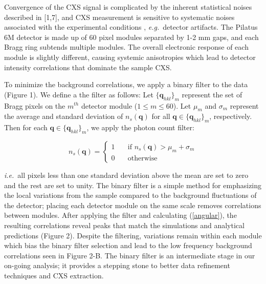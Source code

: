 \documentclass [11pt,fleqn]{article}
\begin{document}
Convergence of the CXS signal is complicated by the inherent statistical noises described in [1,7], and CXS measurement is sensitive to systematic noises associated with the experimental conditions \cite{Kam:1981ua}, \textit{e.g.}~detector artifacts. The Pilatus 6M detector is made up of 60 pixel modules separated by 1-2 mm gaps, and each Bragg ring subtends multiple modules. The overall electronic response of each module is slightly different, causing systemic anisotropies which lead to detector intensity correlations that dominate the sample CXS. 

To minimize the background correlations, we apply a binary filter to the data (Figure 1). We define a the filter as follows: Let $\{ \bm q_{hkl} \}_{m}$ represent the set of Bragg pixels on the $m^{th}$ detector module ($1 \leq m \leq 60$). Let $\mu_m$ and $\sigma_m$ represent the average and standard deviation of $n_{s}(\bm q)$  for all $\bm q \in \{ \bm q_{hkl} \}_{m} $, respectively. Then for each $\bm q \in \{ \bm q_{hkl} \}_{m} $, we apply the photon count filter:

\[  n_{s}(\bm q ) = 
 \begin{cases} 
   1 & \quad \text{if } n_{s}(\bm q ) > \mu_m +  \sigma_m\\
   0 & \quad \text{otherwise} 
 \end{cases} 
 \]

\textit{i.e.}~all pixels less than one standard deviation above the mean are set to zero and the rest are set to unity. The binary filter is a simple method for emphasizing the local variations from the sample compared to the background fluctuations of the detector; placing each detector module on the same scale removes correlations between modules.  After applying the filter and calculating (\ref{angular}), the resulting correlations reveal peaks that match the simulations and analytical predictions (Figure 2). Despite the filtering, variations remain within each module which bias the binary filter selection and lead to the low frequency background correlations seen in Figure 2-B. The binary filter is an intermediate stage in our on-going analysis; it provides a stepping stone to better data refinement techniques and CXS extraction.
\end{document}
